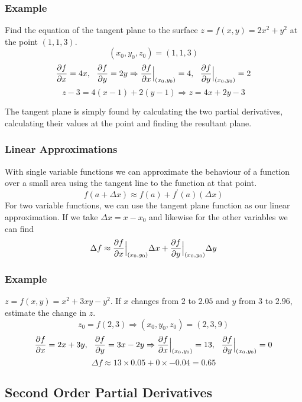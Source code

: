 \documentclass[12pt]{report}
\begin{document}
\begin{flushleft}
\subsubsection*{Example}

\begin{center}
    Find the equation of the tangent plane to the surface
    \(z = f(x, y) = 2x^2 + y^2\) at the point \((1, 1, 3)\).
    \[(x_0, y_0, z_0) = (1, 1, 3)\]
    \[\frac{\partial f}{\partial x} = 4x, \:\:\: \frac{\partial f}{\partial y} = 2y \Rightarrow
    \frac{\partial f}{\partial x}\Bigr\rvert_{(x_0, y_0)} = 4, \:\:\: \frac{\partial f}{\partial y}\Bigr\rvert_{(x_0, y_0)} = 2\]
    \[z - 3 = 4(x - 1) + 2(y - 1) \Rightarrow z = 4x + 2y - 3\]
\end{center}

The tangent plane is simply found by calculating the two partial derivatives,
calculating their values at the point and finding the resultant plane.

\subsubsection*{Linear Approximations}

With single variable functions we can approximate the behaviour of a function
over a small area using the tangent line to the function at that point.
\[f(a + \Delta x) \approx f(a) + f^\prime(a)(\Delta x)\]
For two variable functions, we can use the tangent plane function as our
linear approximation. If we take \(\Delta x = x - x_0\) and likewise for the
other variables we can find
\[\Delta f \approx \frac{\partial f}{\partial x}\Bigr\rvert_{(x_0, y_0)}\Delta x
+ \frac{\partial f}{\partial y}\Bigr\rvert_{(x_0, y_0)}\Delta y\]

\subsubsection*{Example}

\begin{center}
    \(z = f(x, y) = x^2 + 3xy - y^2\). If \(x\) changes from \(2\) to \(2.05\)
    and \(y\) from \(3\) to \(2.96\), estimate the change in \(z\).
    \[z_0 = f(2, 3) \Rightarrow (x_0, y_0, z_0) = (2, 3, 9)\]
    \[\frac{\partial f}{\partial x} = 2x + 3y, \:\:\: \frac{\partial f}{\partial y} = 3x - 2y \Rightarrow
    \frac{\partial f}{\partial x}\Bigr\rvert_{(x_0, y_0)} = 13, \:\:\: \frac{\partial f}{\partial y}\Bigr\rvert_{(x_0, y_0)} = 0\]
    \[\Delta f \approx 13 \times 0.05 + 0 \times -0.04 = 0.65\]
\end{center}

\subsection*{Second Order Partial Derivatives}


\end{flushleft}
\end{document}
